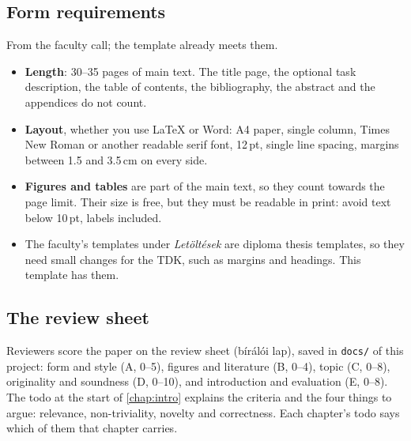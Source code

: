\subsection{Form requirements}\label{app:tdk:form}
From the faculty call; the template already meets them.
\begin{itemize}
  \item \textbf{Length}: 30--35 pages of main text. The title page, the optional task description, the table of contents, the bibliography, the abstract and the appendices do not count.
  \item \textbf{Layout}, whether you use \LaTeX{} or Word: A4 paper, single column, Times New Roman or another readable serif font, 12\,pt, single line spacing, margins between 1.5 and 3.5\,cm on every side.
  \item \textbf{Figures and tables} are part of the main text, so they count towards the page limit. Their size is free, but they must be readable in print: avoid text below 10\,pt, labels included.
  \item The faculty's templates under \emph{Letöltések} are diploma thesis templates, so they need small changes for the TDK, such as margins and headings. This template has them.
\end{itemize}

\subsection{The review sheet}
Reviewers score the paper on the review sheet (bírálói lap), saved in \texttt{docs/} of this project: form and style (A, 0--5), figures and literature (B, 0--4), topic (C, 0--8), originality and soundness (D, 0--10), and introduction and evaluation (E, 0--8). The todo at the start of \cref{chap:intro} explains the criteria and the four things to argue: relevance, non-triviality, novelty and correctness. Each chapter's todo says which of them that chapter carries.
